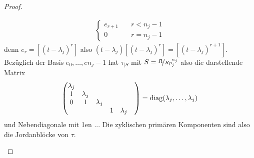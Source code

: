 \begin{proof}
\begin{itemize}
\begin{align*}
\begin{cases}
			e_{r+1} \quad & r<n_j -1\\
			0 \quad & r = n_j -1
			\end{cases}
		\end{align*}
		denn $e_r = [(t-\lambda_j)^r]$ also $(t - \lambda_j)[(t-\lambda_j)^r] = [(t-\lambda_j)^{r+1}]$. Bezüglich der Basis $e_0, \dots, e{n_j -1}$ hat $\tau_{\mid S}$ mit $S = \lnkset{R}{Rp_j^{n_j}}$ also die darstellende Matrix
		\begin{align*} %
			\begin{pmatrix}
			\lambda_j & & & & & \\
			1 &\lambda_j & & & &\\
			0 &1 &\lambda_j & & &\\
			& & & 1&\lambda_j\\
			\end{pmatrix} = \diag(\lambda_j, \dots, \lambda_j)
		\end{align*}
		und Nebendiagonale mit 1en ... Die zyklischen primären Komponenten sind also die Jordanblöcke von $\tau$.
	\end{itemize}
\end{proof}